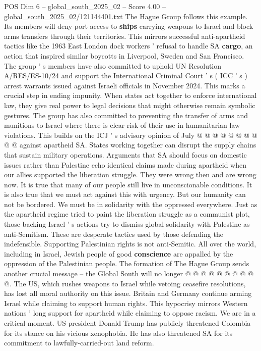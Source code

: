 \begin{textsample}{POS Dim 6 – global\_south\_2025\_02 – Score 4.00 – global\_south\_2025\_02/121144401.txt}
The Hague Group follows this example.
Its members will deny port access to \textbf{ships} carrying weapons to Israel and block arms transfers through their territories.
This mirrors successful anti-apartheid tactics like the 1963 East London dock workers ' refusal to handle SA \textbf{cargo}, an action that inspired similar boycotts in Liverpool, Sweden and San Francisco.
The group ' s members have also committed to uphold UN Resolution A/RES/ES-10/24 and support the International Criminal Court ' s ( ICC ' s ) arrest warrants issued against Israeli officials in November 2024.
This marks a crucial step in ending impunity.
When states act together to enforce international law, they give real power to legal decisions that might otherwise remain symbolic gestures.
The group has also committed to preventing the transfer of arms and munitions to Israel where there is clear risk of their use in humanitarian law violations.
This builds on the ICJ ' s advisory opinion of July @ @ @ @ @ @ @ @ @ @ against apartheid SA.
States working together can disrupt the supply chains that sustain military operations.
Arguments that SA should focus on domestic issues rather than Palestine echo identical claims made during apartheid when our allies supported the liberation struggle.
They were wrong then and are wrong now.
It is true that many of our people still live in unconscionable conditions.
It is also true that we must act against this with urgency.
But our humanity can not be bordered.
We must be in solidarity with the oppressed everywhere.
Just as the apartheid regime tried to paint the liberation struggle as a communist plot, those backing Israel ' s actions try to dismiss global solidarity with Palestine as anti-Semitism.
These are desperate tactics used by those defending the indefensible.
Supporting Palestinian rights is not anti-Semitic.
All over the world, including in Israel, Jewish people of good \textbf{conscience} are appalled by the oppression of the Palestinian people.
The formation of The Hague Group sends another crucial message -- the Global South will no longer @ @ @ @ @ @ @ @ @ @.
The US, which rushes weapons to Israel while vetoing ceasefire resolutions, has lost all moral authority on this issue.
Britain and Germany continue arming Israel while claiming to support human rights.
This hypocrisy mirrors Western nations ' long support for apartheid while claiming to oppose racism.
We are in a critical moment.
US president Donald Trump has publicly threatened Colombia for its stance on his vicious xenophobia.
He has also threatened SA for its commitment to lawfully-carried-out land reform.

\end{textsample}
